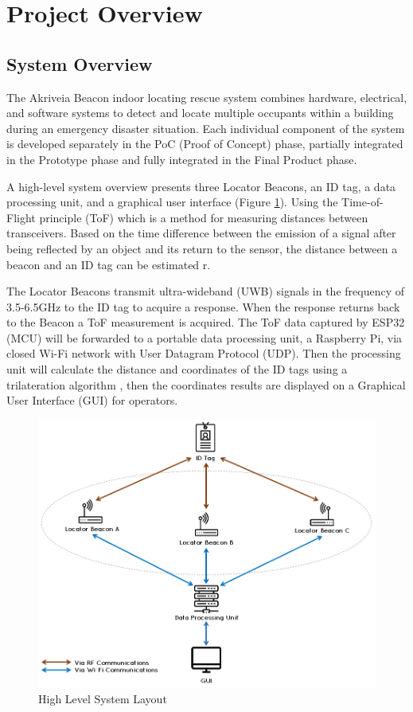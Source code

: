 

\setcounter{section}{1}
\section{Project Overview}
\bigskip
\subsection{System Overview}
\medskip
The Akriveia Beacon indoor locating rescue system combines hardware, electrical, and software systems to detect and locate multiple occupants within a building during an emergency disaster situation. Each individual component of the system is developed separately in the PoC (Proof of Concept) phase, partially integrated in the Prototype phase and fully integrated in the Final Product phase. 

\bigskip
A high-level system overview presents three Locator Beacons, an ID tag, a data processing unit, and a graphical user interface (Figure \ref{sys_arch}). Using the Time-of-Flight principle (ToF) which is a method for measuring distances between transceivers. Based on the time difference between the emission of a signal after being reflected by an object and its return to the sensor, the distance between a beacon and an ID tag can be estimated r\cite{R2-0}. 

\bigskip
The Locator Beacons transmit ultra-wideband (UWB) signals in the frequency of 3.5-6.5GHz to the ID tag to acquire a response. When the response returns back to the Beacon a ToF measurement is acquired. The ToF data captured by ESP32 (MCU) will be forwarded to a portable data processing unit, a Raspberry Pi, via closed Wi-Fi network with User Datagram Protocol (UDP). Then the processing unit will calculate the distance and coordinates of the ID tags using a trilateration algorithm , then the coordinates results are displayed on a Graphical User Interface (\Gls{GUI})  for operators.


\medskip
\begin{figure}[H]
\centering
    \includegraphics[scale=0.60]{./images/00_sys_arch.png}
    \caption{High Level System Layout}
    \label{sys_arch}
\end{figure}
\pagebreak

